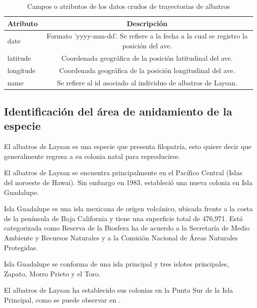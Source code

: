 \documentclass[a4paper, 11pt]{article}
\begin{document}
\begin{table}[h!]
\caption{Campos o atributos de los datos crudos de trayectorias de albatros}
\begin{center}
    \begin{tabular}{lc}
        Atributo & Descripción \\
        \hline
        date & Formato 'yyyy-mm-dd'. Se refiere a la fecha a la cual se
        registro la posición del ave. \\
        latitude & Coordenada geográfica de la posición latitudinal del ave. \\
        longitude & Coordenada geográfica de la posición longitudinal del ave. \\
        name & Se refiere al id asociado al individuo de albatros de Laysan.\\
    \end{tabular}
\end{center}
\end{table}

\subsection{Identificación del área de anidamiento de la especie}

El albatros de Laysan es una especie que presenta filopatría, esto quiere decir
que generalmente regresa a su colonia natal para reproducirse.

El albatros de Laysan se encuentra principalmente en el Pacífico Central (Islas
del noroeste de Hawai). Sin embargo en 1983, estableció una nueva colonia en
Isla Guadalupe.

Isla Guadalupe es una isla mexicana de origen volcánico, ubicada frente a la
costa de la península de Baja California y tiene una superficie total de
476,971. Está categorizada como Reserva de la Biosfera ha de acuerdo a la
Secretaría de Medio Ambiente y Recursos Naturales y a la Comisión Nacional de
Áreas Naturales Protegidas.

Isla Guadalupe se conforma de una isla principal y tres islotes principales,
Zapato, Morro Prieto y el Toro.

El albatros de Laysan ha establecido sus colonias en la Punta Sur de la Isla
Principal, como se puede observar en .
\end{document}

